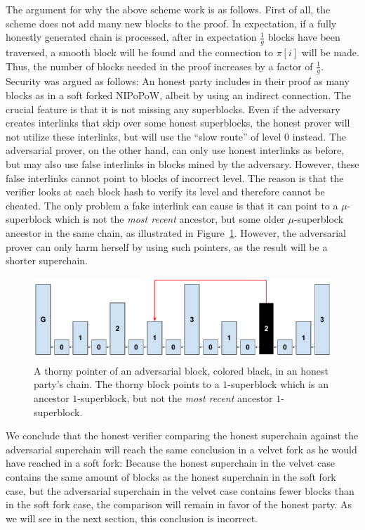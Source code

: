 The argument for why the above scheme work is as follows. First of all, the
scheme does not add many new blocks to the proof. In expectation, if a fully
honestly generated chain is processed, after in expectation $\frac{1}{g}$ blocks
have been traversed, a smooth block will be found and the connection to $\pi[i]$
will be made. Thus, the number of blocks needed in the proof increases by a
factor of $\frac{1}{g}$. Security was argued as follows: An honest party
includes in their proof as many blocks as in a soft forked NIPoPoW, albeit by
using an indirect connection. The crucial feature is that it is not missing any
superblocks. Even if the adversary creates interlinks that skip over some honest
superblocks, the honest prover will not utilize these interlinks, but will use
the ``slow route'' of level $0$ instead. The adversarial prover, on the other
hand, can only use honest interlinks as before, but may also use false
interlinks in blocks mined by the adversary. However, these false
interlinks cannot point to blocks of incorrect level. The reason is
that the verifier looks at each block hash to verify its level and
therefore cannot be cheated. The only problem a fake interlink can cause is that
it can point to a $\mu$-superblock which is not the \emph{most recent} ancestor,
but some older $\mu$-superblock ancestor in the same chain,
as illustrated in Figure~\ref{fig:skip_ancestor}. However, the adversarial
prover can only harm herself by using such pointers, as the result will
be a shorter superchain.

\begin{figure}[h]
	\begin{center}
		\includegraphics[width=0.8\columnwidth]{figures/simple_thorny.pdf}
	\end{center}
    \caption{A thorny pointer of an adversarial block, colored black, in an honest party's chain. The thorny block points to a $1$-superblock which is an ancestor
		$1$-superblock, but not the \emph{most recent} ancestor $1$-superblock.}
	\label{fig:skip_ancestor}
\end{figure}

We conclude that the honest verifier comparing the honest superchain
against the adversarial superchain will reach the same conclusion in a velvet
fork as he would have reached in a soft fork: Because the honest
superchain in the velvet case contains the same amount of blocks as the honest
superchain in the soft fork case, but the adversarial superchain in the velvet
case contains fewer blocks than in the soft fork case, the comparison will
remain in favor of the honest party. As we will see in the next section, this
conclusion is incorrect.
